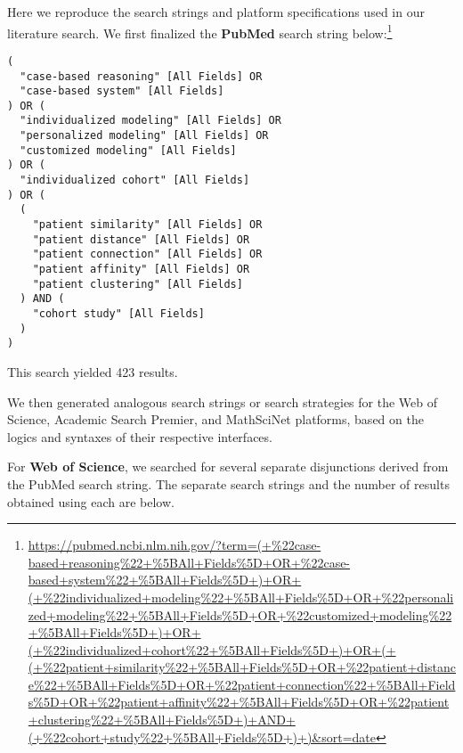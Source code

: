 \documentclass[preprint, 3p,
authoryear]{elsarticle} %
\begin{document}
Here we reproduce the search strings and platform specifications used in
our literature search. We first finalized the \textbf{PubMed} search
string below:\footnote{\url{https://pubmed.ncbi.nlm.nih.gov/?term=(+\%22case-based+reasoning\%22+\%5BAll+Fields\%5D+OR+\%22case-based+system\%22+\%5BAll+Fields\%5D+)+OR+(+\%22individualized+modeling\%22+\%5BAll+Fields\%5D+OR+\%22personalized+modeling\%22+\%5BAll+Fields\%5D+OR+\%22customized+modeling\%22+\%5BAll+Fields\%5D+)+OR+(+\%22individualized+cohort\%22+\%5BAll+Fields\%5D+)+OR+(+(+\%22patient+similarity\%22+\%5BAll+Fields\%5D+OR+\%22patient+distance\%22+\%5BAll+Fields\%5D+OR+\%22patient+connection\%22+\%5BAll+Fields\%5D+OR+\%22patient+affinity\%22+\%5BAll+Fields\%5D+OR+\%22patient+clustering\%22+\%5BAll+Fields\%5D+)+AND+(+\%22cohort+study\%22+\%5BAll+Fields\%5D+)+)\&sort=date}}

\begin{verbatim}
(
  "case-based reasoning" [All Fields] OR
  "case-based system" [All Fields]
) OR (
  "individualized modeling" [All Fields] OR
  "personalized modeling" [All Fields] OR
  "customized modeling" [All Fields]
) OR (
  "individualized cohort" [All Fields]
) OR (
  (
    "patient similarity" [All Fields] OR
    "patient distance" [All Fields] OR
    "patient connection" [All Fields] OR
    "patient affinity" [All Fields] OR
    "patient clustering" [All Fields]
  ) AND (
    "cohort study" [All Fields]
  )
)
\end{verbatim}

This search yielded 423 results.

We then generated analogous search strings or search strategies for the
Web of Science, Academic Search Premier, and MathSciNet platforms, based
on the logics and syntaxes of their respective interfaces.

For \textbf{Web of Science}, we searched for several separate
disjunctions derived from the PubMed search string. The separate search
strings and the number of results obtained using each are below.
\end{document}
